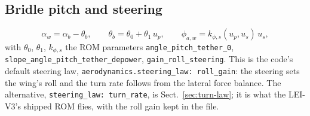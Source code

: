 \documentclass[11pt,a4paper]{article}
\newcommand{\code}[1]{\texttt{\small #1}}
\begin{document}
\subsection{Bridle pitch and steering}
\begin{equation}
  \alpha_w=\alpha_b-\theta_b,\qquad
  \theta_b=\theta_0+\theta_1\,u_p,\qquad
  \phi_{a,w}=k_{\phi,s}(u_p,u_s)\,u_s ,
\end{equation}
with $\theta_0$, $\theta_1$, $k_{\phi,s}$ the ROM parameters
\code{angle\_pitch\_tether\_0}, \code{slope\_angle\_pitch\_tether\_depower},
\code{gain\_roll\_steering}. This is the code's default steering law,
\code{aerodynamics.steering\_law: roll\_gain}: the steering sets the wing's roll and
the turn rate follows from the lateral force balance. The alternative,
\code{steering\_law: turn\_rate}, is Sect.~\ref{sec:turn-law}; it is what the LEI-V3's
shipped ROM flies, with the roll gain kept in the file.
\end{document}
